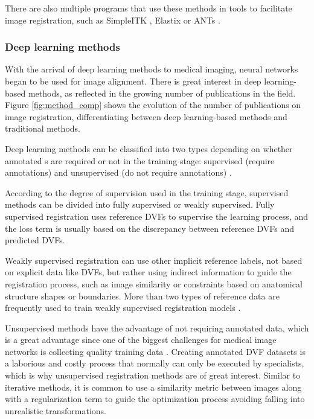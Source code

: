 There are also multiple programs that use these methods in tools to facilitate image registration, such as SimpleITK \cite{simpleitk}, Elastix \cite{elastix} or ANTs \cite{ants}.

\subsubsection{Deep learning methods}\label{subsubsec:Deep learning methods}

With the arrival of deep learning methods to medical imaging, neural networks began to be used for image alignment.
There is great interest in deep learning-based methods, as reflected in the growing number of publications in the field. Figure \ref{fig:method_comp} shows the evolution of the number of publications on image registration, differentiating between deep learning-based methods and traditional methods.

Deep learning methods can be classified into two types depending on whether annotated s are required or not in the training stage:
supervised (require annotations) and unsupervised (do not require annotations) \cite{nie2024medicalimageregistrationapplication}.

According to the degree of supervision used in the training stage, supervised methods can be divided into fully supervised or weakly supervised.
Fully supervised registration uses reference DVFs to supervise the learning process, and the loss term is usually based on the discrepancy between reference DVFs and predicted DVFs.

Weakly supervised registration can use other implicit reference labels, not based on explicit data like DVFs, but rather using indirect information to guide the registration process, such as image similarity or constraints based on anatomical structure shapes or boundaries.
More than two types of reference data are frequently used to train weakly supervised registration models \cite{bharati2022deeplearningmedicalimage}.

Unsupervised methods have the advantage of not requiring annotated data, which is a great advantage since one of the biggest challenges for medical image networks is collecting quality training data \cite{medicalimageanalysis}.
Creating annotated DVF datasets is a laborious and costly process that normally can only be executed by specialists, which is why unsupervised registration methods are of great interest.
Similar to iterative methods, it is common to use a similarity metric between images along with a regularization term to guide the optimization process avoiding falling into unrealistic transformations.

